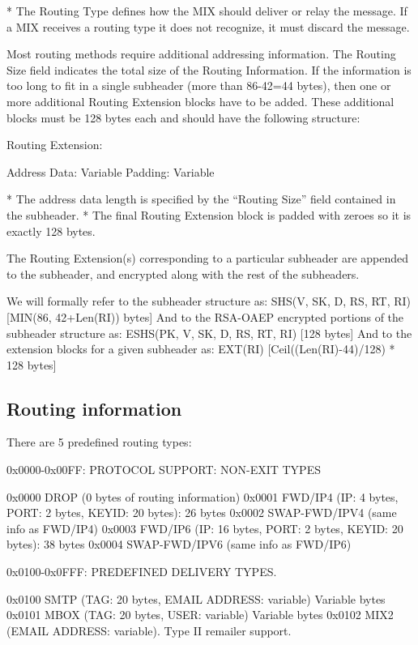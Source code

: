 * The Routing Type defines how the MIX should deliver or relay the
  message. If a MIX receives a routing type it does not recognize,
  it must discard the message.

  Most routing methods require additional addressing information.
  The Routing Size field indicates the total size of the Routing
  Information. If the information is too long to fit in a single
  subheader (more than 86-42=44 bytes), then one or more additional
  Routing Extension blocks have to be added. These additional blocks
  must be 128 bytes each and should have the following structure:
 
  Routing Extension:

    Address Data:     Variable
    Padding:          Variable

* The address data length is specified by the ``Routing Size'' field
  contained in the subheader.
* The final Routing Extension block is padded with zeroes so it is
  exactly 128 bytes.

The Routing Extension(s) corresponding to a particular subheader are
appended to the subheader, and encrypted along with the rest of the
subheaders.

We will formally refer to the subheader structure as:
SHS(V, SK, D, RS, RT, RI)     [MIN(86, 42+Len(RI)) bytes] 
And to the RSA-OAEP encrypted portions of the subheader structure as:
ESHS(PK, V, SK, D, RS, RT, RI)   [128 bytes]
And to the extension blocks for a given subheader as:
EXT(RI)                       [Ceil((Len(RI)-44)/128) * 128 bytes]

\subsection{Routing information}

There are 5 predefined routing types:

0x0000-0x00FF: PROTOCOL SUPPORT: NON-EXIT TYPES

0x0000 DROP    (0 bytes of routing information)
0x0001 FWD/IP4 (IP: 4 bytes, PORT: 2 bytes, KEYID: 20 bytes): 26 bytes
0x0002 SWAP-FWD/IPV4 (same info as FWD/IP4)
0x0003 FWD/IP6 (IP: 16 bytes, PORT: 2 bytes, KEYID: 20 bytes): 38 bytes
0x0004 SWAP-FWD/IPV6 (same info as FWD/IP6)

0x0100-0x0FFF: PREDEFINED DELIVERY TYPES.

0x0100 SMTP   (TAG: 20 bytes, EMAIL ADDRESS: variable) Variable bytes
0x0101 MBOX   (TAG: 20 bytes, USER: variable) Variable bytes
0x0102 MIX2   (EMAIL ADDRESS: variable).  Type II remailer support.

